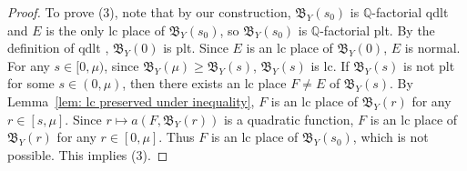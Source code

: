 \documentclass[11pt,reqno]{amsart}
\numberwithin{equation}{section}
\newcommand{\Bb}{{\mathfrak{B}}}
\theoremstyle{definition}
\begin{document}
\begin{proof}
To prove (3), note that by our construction, $\Bb_Y(s_0)$ is $\mathbb Q$-factorial qdlt and $E$ is the only lc place of $\Bb_Y(s_0)$, so $\Bb_Y(s_0)$ is $\mathbb Q$-factorial plt. By the definition of qdlt \cite[Definition~3.1]{Cas+24}, $\Bb_Y(0)$ is plt. Since $E$ is an lc place of $\Bb_Y(0)$, $E$ is normal. For any $s\in [0,\mu)$, since $\Bb_Y(\mu)\geq\Bb_Y(s)$, $\Bb_Y(s)$ is lc. If $\Bb_Y(s)$ is not plt for some $s\in (0,\mu)$, then there exists an lc place $F\neq E$ of $\Bb_Y(s)$. By Lemma~\ref{lem: lc preserved under inequality}, $F$ is an lc place of $\Bb_Y(r)$ for any $r\in [s,\mu]$. Since $r\mapsto a(F,\Bb_Y(r))$ is a quadratic function, 
$F$ is an lc place of $\Bb_Y(r)$ for any $r\in [0,\mu]$. Thus $F$ is an lc place of $\Bb_Y(s_0)$, which is not possible. This implies (3).
\end{proof}
\end{document}
